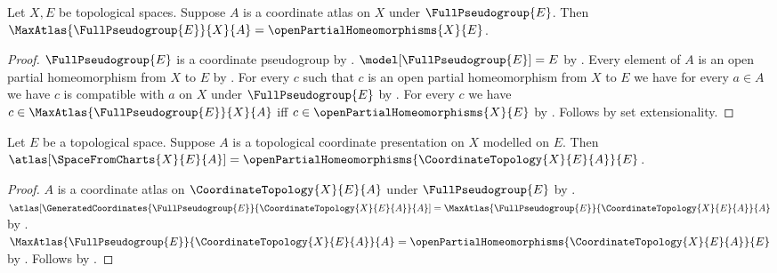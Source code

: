 \begin{theorem}\label{full_max_atlas}
    Let $X,E$ be topological spaces.
    Suppose $A$ is a coordinate atlas on $X$ under $\FullPseudogroup{E}$.
    Then $\MaxAtlas{\FullPseudogroup{E}}{X}{A}=\openPartialHomeomorphisms{X}{E}$.
\end{theorem}
\begin{proof}
    $\FullPseudogroup{E}$ is a coordinate pseudogroup by .
    $\model[\FullPseudogroup{E}]=E$ by .
    Every element of $A$ is an open partial homeomorphism from $X$ to $E$ by
        .
    For every $c$ such that $c$ is an open partial homeomorphism from $X$ to $E$
        we have for every $a\in A$ we have
            $c$ is compatible with $a$ on $X$ under $\FullPseudogroup{E}$ by
        .
    For every $c$ we have $c\in\MaxAtlas{\FullPseudogroup{E}}{X}{A}$ iff
        $c\in\openPartialHomeomorphisms{X}{E}$ by
        .
    Follows by set extensionality.
\end{proof}

\begin{theorem}\label{space_from_charts_atlas}
    Let $E$ be a topological space.
    Suppose $A$ is a topological coordinate presentation on $X$ modelled on $E$.
    Then $\atlas[\SpaceFromCharts{X}{E}{A}]
        =\openPartialHomeomorphisms{\CoordinateTopology{X}{E}{A}}{E}$.
\end{theorem}
\begin{proof}
    $A$ is a coordinate atlas on $\CoordinateTopology{X}{E}{A}$ under
        $\FullPseudogroup{E}$ by .
    $\atlas[\GeneratedCoordinates{\FullPseudogroup{E}}{\CoordinateTopology{X}{E}{A}}{A}]
        =\MaxAtlas{\FullPseudogroup{E}}{\CoordinateTopology{X}{E}{A}}{A}$ by
        .
    $\MaxAtlas{\FullPseudogroup{E}}{\CoordinateTopology{X}{E}{A}}{A}
        =\openPartialHomeomorphisms{\CoordinateTopology{X}{E}{A}}{E}$ by
        .
    Follows by .
\end{proof}


